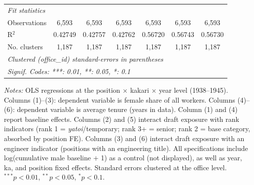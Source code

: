 \begin{table}[htbp]
\begin{threeparttable}
\begin{tabular}{lcccccc}
   \midrule
   \emph{Fit statistics}\\
   Observations                   & 6,593    & 6,593          & 6,593          & 6,593           & 6,593           & 6,593\\  
   R$^2$                          & 0.42749  & 0.42757        & 0.42762        & 0.56720         & 0.56743         & 0.56730\\  
   No. clusters & 1,187    & 1,187          & 1,187          & 1,187           & 1,187           & 1,187\\  
   \midrule \midrule
   \multicolumn{7}{l}{\emph{Clustered (office\_id) standard-errors in parentheses}}\\
   \multicolumn{7}{l}{\emph{Signif. Codes: ***: 0.01, **: 0.05, *: 0.1}}\\
\end{tabular}
\begin{tablenotes}[flushleft]
\footnotesize
\item \textit{Notes:} OLS regressions at the position $\times$ kakari $\times$ year level (1938--1945). Columns (1)--(3): dependent variable is female share of all workers. Columns (4)--(6): dependent variable is average tenure (years in data). Column (1) and (4) report baseline effects. Columns (2) and (5) interact draft exposure with rank indicators (rank 1 = \emph{yatoi}/temporary; rank 3+ = senior; rank 2 = base category, absorbed by position FE). Columns (3) and (6) interact draft exposure with an engineer indicator (positions with an engineering title). All specifications include log(cumulative male baseline $+$ 1) as a control (not displayed), as well as year, ka, and position fixed effects. Standard errors clustered at the office level. $^{***}p<0.01$, $^{**}p<0.05$, $^{*}p<0.1$.
\end{tablenotes}
\end{threeparttable}
\end{table}
